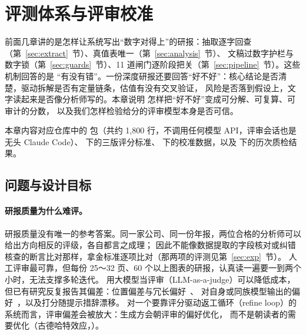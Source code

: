 \providecommand{\evqed}{\hfill$\square$}
\newenvironment{evproof}{\par\noindent\textit{证明.}\ }{\evqed\par}
\section{评测体系与评审校准}
\label{sec:eval}

前面几章讲的是怎样让系统写出“数字对得上”的研报：抽取逐字回查（第~\ref{sec:extract}~节）、真值表唯一（第~\ref{sec:analysis}~节）、
文稿过数字护栏与数字锁（第~\ref{sec:guards}~节）、11 道闸门逐阶段把关（第~\ref{sec:pipeline}~节）。这些机制回答的是
“有没有错”。一份深度研报还要回答“好不好”：核心结论是否清楚，驱动拆解是否有定量链条，估值有没有交叉验证，
风险是否落到假设上，文字读起来是否像分析师写的。本章说明 \sysname{} 怎样把“好不好”变成可分解、可复算、可审计的分数，
以及我们怎样检验给分的评审模型本身是否可信。

本章内容对应仓库中的  包（共约 1{,}800 行，不调用任何模型 API，评审会话也是无头 Claude Code）、
 下的三版评分标准、 下的校准数据，以及  下的历次质检结果。

\subsection{问题与设计目标}
\label{sec:eval-motivation}

\paragraph{研报质量为什么难评。}
研报质量没有唯一的参考答案。同一家公司、同一份年报，两位合格的分析师可以给出方向相反的评级，各自都言之成理；
因此不能像数据提取的字段核对或纠错核查的断言比对那样，拿金标准逐项比对（那两项的评测见第~\ref{sec:exp}~节）。
人工评审最可靠，但每份 25～32 页、60 个以上图表的研报，认真读一遍要一到两个小时，无法支撑多轮迭代。
用大模型当评审（LLM-as-a-judge）可以降低成本，但已有研究反复报告其偏差：位置偏差与冗长偏好~\citep{zheng2023judging,wang2024fair}、
对自身或同族模型输出的偏好~\citep{panickssery2024self}，以及打分随提示措辞漂移。
对一个要靠评分驱动返工循环（refine loop）的系统而言，评审偏差会被放大：生成方会朝评审的偏好优化，
而不是朝读者的需要优化（古德哈特效应，\citealp{manheim2018goodhart}）。

